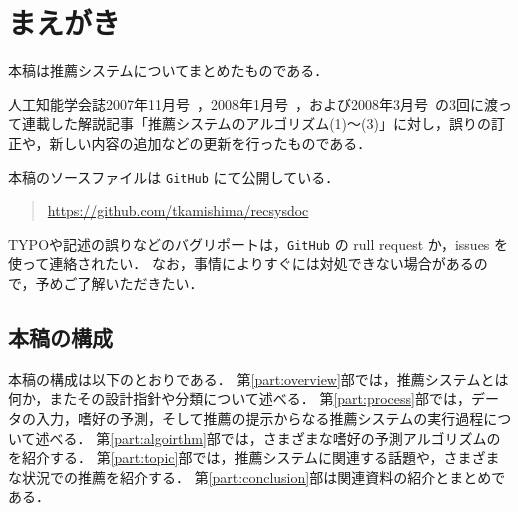 \chapter*{まえがき}
\label{chap:preface}

本稿は推薦システムについてまとめたものである．

人工知能学会誌2007年11月号~\cite{jpublist:076}，2008年1月号~\cite{jpublist:081}，および2008年3月号~\cite{jpublist:083}の3回に渡って連載した解説記事「推薦システムのアルゴリズム(1)〜(3)」に対し，誤りの訂正や，新しい内容の追加などの更新を行ったものである．

本稿のソースファイルは \texttt{GitHub} にて公開している．
\begin{quote}
\url{https://github.com/tkamishima/recsysdoc}
\end{quote}
TYPOや記述の誤りなどのバグリポートは，\texttt{GitHub} の rull request か，issues を使って連絡されたい．
なお，事情によりすぐには対処できない場合があるので，予めご了解いただきたい．

\section*{本稿の構成}
\label{sec:preface-organization}

本稿の構成は以下のとおりである．
第\ref{part:overview}部では，推薦システムとは何か，またその設計指針や分類について述べる．
第\ref{part:process}部では，データの入力，嗜好の予測，そして推薦の提示からなる推薦システムの実行過程について述べる．
第\ref{part:algoirthm}部では，さまざまな嗜好の予測アルゴリズムのを紹介する．
第\ref{part:topic}部では，推薦システムに関連する話題や，さまざまな状況での推薦を紹介する．
第\ref{part:conclusion}部は関連資料の紹介とまとめである．
